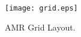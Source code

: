 \documentclass[12pt]{article}
\newcommand{\double }{\renewcommand{\baselinestretch}{1.66} \large \normalsize}
\begin{document}

\begin{figure}[htbp]
\hskip -3.4cm
\texttt{[image: grid.eps]}
\caption{AMR Grid Layout.}
\label{grid}
\end{figure}  
\end{document}
